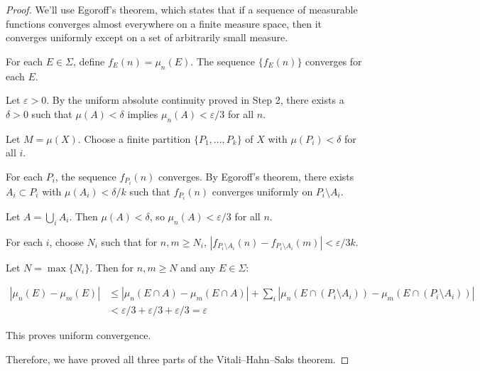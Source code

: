 \documentclass{article}
\begin{document}
\begin{proof}
We'll use Egoroff's theorem, which states that if a sequence of measurable functions converges almost everywhere on a finite measure space, then it converges uniformly except on a set of arbitrarily small measure.

For each $E \in \Sigma$, define $f_E(n) = \mu_n(E)$. The sequence $\{f_E(n)\}$ converges for each $E$.

Let $\varepsilon > 0$. By the uniform absolute continuity proved in Step 2, there exists a $\delta > 0$ such that $\mu(A) < \delta$ implies $\mu_n(A) < \varepsilon/3$ for all $n$.

Let $M = \mu(X)$. Choose a finite partition $\{P_1, ..., P_k\}$ of $X$ with $\mu(P_i) < \delta$ for all $i$.

For each $P_i$, the sequence $f_{P_i}(n)$ converges. By Egoroff's theorem, there exists $A_i \subset P_i$ with $\mu(A_i) < \delta/k$ such that $f_{P_i}(n)$ converges uniformly on $P_i \setminus A_i$.

Let $A = \bigcup_i A_i$. Then $\mu(A) < \delta$, so $\mu_n(A) < \varepsilon/3$ for all $n$.

For each $i$, choose $N_i$ such that for $n, m \geq N_i$, $|f_{P_i\setminus A_i}(n) - f_{P_i\setminus A_i}(m)| < \varepsilon/3k$.

Let $N = \max\{N_i\}$. Then for $n, m \geq N$ and any $E \in \Sigma$:

\begin{align*}
|\mu_n(E) - \mu_m(E)| &\leq |\mu_n(E \cap A) - \mu_m(E \cap A)| + \sum_i |\mu_n(E \cap (P_i \setminus A_i)) - \mu_m(E \cap (P_i \setminus A_i))| \\
                      &< \varepsilon/3 + \varepsilon/3 + \varepsilon/3 = \varepsilon
\end{align*}

This proves uniform convergence.

Therefore, we have proved all three parts of the Vitali--Hahn--Saks theorem.
\end{proof}
\end{document}
